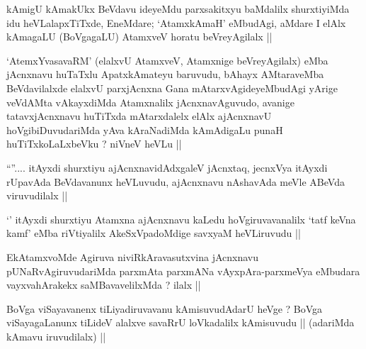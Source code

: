 
\begin{artha}
kAmigU kAmakUkx BeVdavu ideyeMdu parxsakitxyu baMdalilx shurxtiyiMda
idu heVLalapxTiTxde, EneMdare; `AtamxkAmaH' eMbudAgi, aMdare I elAlx
kAmagaLU (BoVgagaLU) AtamxveV horatu beVreyAgilalx ||
\end{artha}


\begin{artha}
`AtemxYvasavaRM' (elalxvU AtamxveV, Atamxnige beVreyAgilalx) eMba
  jAcnxnavu huTaTxlu ApatxkAmateyu baruvudu, bAhayx AMtaraveMba
  BeVdavilalxde elalxvU parxjAcnxna Gana mAtarxvAgideyeMbudAgi yArige
  veVdAMta vAkayxdiMda Atamxnalilx jAcnxnavAguvudo, avanige
  tatavxjAcnxnavu huTiTxda mAtarxdalelx elAlx ajAcnxnavU
  hoVgibiDuvudariMda yAva kAraNadiMda kAmAdigaLu punaH
  huTiTxkoLaLxbeVku ? niVneV heVLu ||
\end{artha}


\begin{artha}
``\stext''.... itAyxdi shurxtiyu ajAcnxnavidAdxgaleV jAcnxtaq, jecnxVya
  itAyxdi rUpavAda BeVdavanunx heVLuvudu, ajAcnxnavu nAshavAda meVle
  ABeVda viruvudilalx ||    
\end{artha}


\begin{artha}
`\stext' itAyxdi shurxtiyu Atamxna ajAcnxnavu kaLedu hoVgiruvavanalilx
  `tatf keVna kamf' eMba riVtiyalilx AkeSxVpadoMdige savxyaM
  heVLiruvudu ||
\end{artha}


\begin{artha}
EkAtamxvoMde Agiruva niviRkAravasutxvina jAcnxnavu
pUNaRvAgiruvudariMda parxmAta parxmANa vAyxpAra-parxmeVya eMbudara
vayxvahArakekx saMBavavelilxMda ? ilalx ||
\end{artha}


\begin{artha}
BoVga viSayavanenx tiLiyadiruvavanu kAmisuvudAdarU heVge ? BoVga
viSayagaLanunx tiLideV alalxve savaRrU loVkadalilx kAmisuvudu ||
(adariMda kAmavu iruvudilalx) ||
\end{artha}

